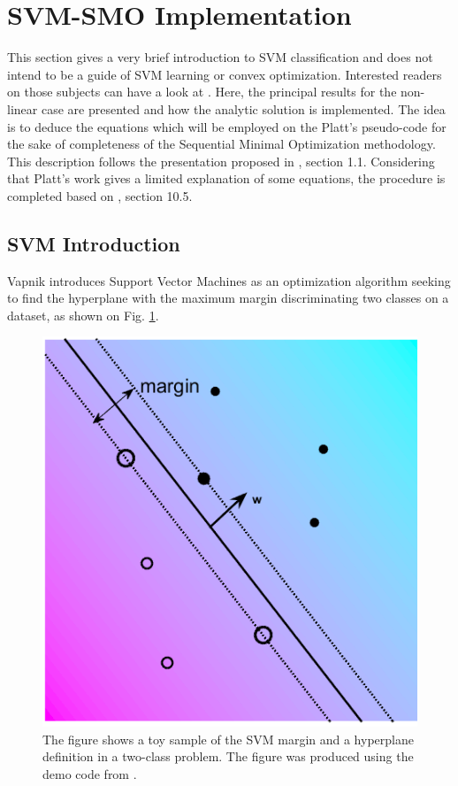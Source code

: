 \documentclass{ipol}
\begin{document}

\section{SVM-SMO Implementation}

This section gives a very brief introduction to SVM classification and does not intend to be a guide of SVM learning or convex optimization.
Interested readers on those subjects can have a look at \cite{Burges1998,Cortes:1995,Scholkopf:2002}.
Here, the principal results for the non-linear case are presented and how the analytic solution is implemented.
The idea is to deduce the equations which will be employed on the Platt's pseudo-code for the sake of completeness of the Sequential Minimal Optimization methodology.
This description follows the presentation proposed in \cite{Platt:1998}, section 1.1.
Considering that Platt’s work gives a limited explanation of some equations, the procedure is completed based on \cite{Scholkopf:2002}, section 10.5. 


\subsection{SVM Introduction}

Vapnik \cite{Vapnik:1995} introduces Support Vector Machines as an optimization algorithm seeking to find the hyperplane with the maximum margin discriminating two classes on a dataset, as shown on Fig. \ref{fig:svm_margin}.

\begin{figure}[!htbp]
\begin{center}
\includegraphics[width=.5\linewidth]{svm_margin.png}
\caption{The figure shows a toy sample of the SVM margin and a hyperplane definition in a two-class problem. The figure was produced using the demo code from \cite{Scholkopf:2002}.}
\label{fig:svm_margin}
\end{center}
\end{figure}
\end{document}
